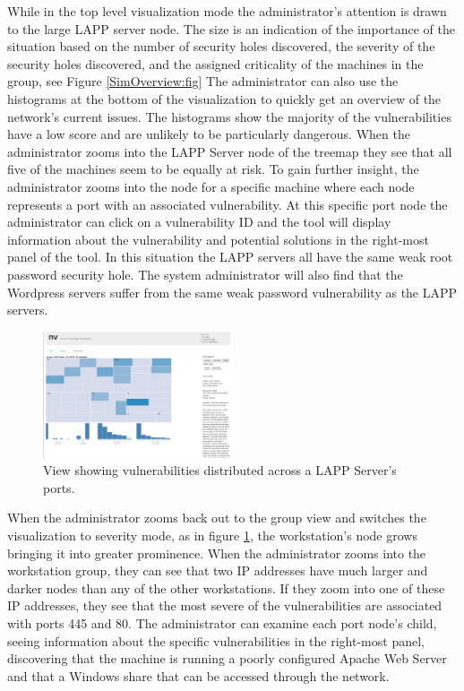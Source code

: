 \documentclass{acm_proc_article-sp}
\begin{document}
While in the top level visualization mode the administrator's attention is
drawn to the large LAPP server node. The size is an indication of the
importance of the situation based on the number of security holes discovered,
the severity of the security holes discovered, and the assigned criticality of
the machines in the group, see Figure \ref{SimOverview:fig}
The administrator can also use the histograms at the bottom of the visualization to quickly get an overview of the network's current issues.
The histograms show the majority of the vulnerabilities have a low score and are unlikely to be particularly dangerous.
When the administrator zooms into the LAPP Server
node of the treemap they see that all five of the machines seem to be equally
at risk. To gain further insight, the administrator zooms into the node for a
specific machine where each node represents a port with an associated
vulnerability. At this specific port node the administrator can click on a
vulnerability ID and the tool will display information about the vulnerability
and potential solutions in the right-most panel of the tool. In this situation the LAPP servers all have the same
weak root password security hole. The system administrator will also find that
the Wordpress servers suffer from the same weak password vulnerability as the
LAPP servers.

\begin{figure}
  \centering
  \includegraphics[width=0.5\textwidth]{../screenshots/final/LappServerSimPort}
  \caption{View showing vulnerabilities distributed across a LAPP Server's ports.}
  \label{LAPPServerPort:fig}
\end{figure}

When the administrator zooms back out to the
group view and switches the visualization to severity mode, as in figure \ref{LAPPServerPort:fig}, the workstation's
node grows bringing it into greater prominence. When the administrator
zooms into the workstation group, they can see that two IP addresses have much
larger and darker nodes than any of the other workstations. If they zoom into
one of these IP addresses, they see that the most severe of the vulnerabilities
are associated with ports 445 and 80. The administrator can examine each port
node's child, seeing information about the specific vulnerabilities in the right-most
panel, discovering that the machine is running a poorly configured Apache
Web Server and that a Windows share that can be accessed through the network.
\end{document}
